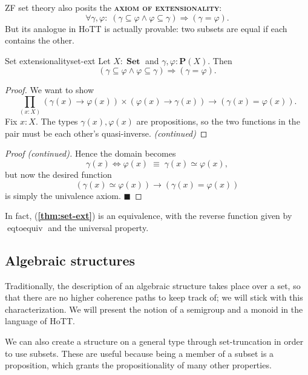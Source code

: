 \documentclass{article}
\newcommand{\defn}[1]{{\scshape\bfseries\color{MPBemph}#1}}
\renewcommand{\qed}{\hfill{\color{MPBthm}\( \blacksquare \)}}
\newcommand{\tpi}[1]{\prod_{(#1)}}
\newcommand{\1}{\textbf{1}}
\newcommand{\0}{\mathbf{0}}
\newcommand{\2}{\textbf{2}}
\DeclareMathOperator{\eqtoequiv}{eqtoequiv}
\DeclareMathOperator{\Set}{\textbf{Set}}
\renewcommand{\P}{\textbf{P}}
\begin{document}
ZF set theory also posits the \defn{axiom of extensionality}:
\[ \forall \gamma, \varphi:\; (\gamma \subseteq \varphi \wedge \varphi \subseteq \gamma) \Rightarrow (\gamma = \varphi). \]
But its analogue in HoTT is actually provable: two subsets are equal if each contains the other.
\begin{thm}{Set extensionality}{set-ext} Let \( X : \Set \) and \( \gamma, \varphi : \P(X) \). Then
\[ (\gamma \subseteq \varphi \wedge \varphi \subseteq \gamma) \Rightarrow (\gamma = \varphi). \]
\begin{proof}
	We want to show
	\[ \tpi{x : X} (\gamma(x) \to \varphi(x)) \times (\varphi(x) \to \gamma(x)) \to (\gamma(x) = \varphi(x)). \]
	Fix \( x : X \). The types \( \gamma(x), \varphi(x) \) are propositions, so the two functions in the pair must be each other's quasi-inverse.
\hfill \emph{\color{MPBthm}(continued)}	\end{proof}
\begin{proof}[Proof (continued)]
	Hence the domain becomes
	\[ \gamma(x) \Leftrightarrow \varphi(x) \;\equiv\; \gamma(x) \simeq \varphi(x), \]
	but now the desired function
	\[ (\gamma(x) \simeq \varphi(x)) \to (\gamma(x) = \varphi(x)) \]
	is simply the univalence axiom. \qed
\end{proof} \end{thm} \noindent
In fact, (\textbf{\color{MPBthm}\ref{thm:set-ext}}) is an equivalence, with the reverse function given by \( \eqtoequiv \) and the universal property.
\subsection{Algebraic structures}
Traditionally, the description of an algebraic structure takes place over a set, so that there are no higher coherence paths to keep track of; we will stick with this characterization. We will present the notion of a semigroup and a monoid in the language of HoTT.

We can also create a structure on a general type through set-truncation in order to use subsets. These are useful because being a member of a subset is a proposition, which grants the propositionality of many other properties.
\end{document}
